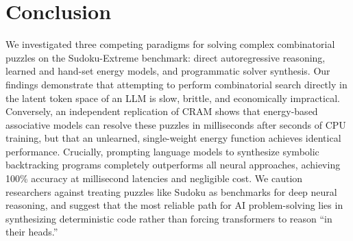 \documentclass{article} %
\begin{document}
\section{Conclusion}
\label{sec:conclusion}
We investigated three competing paradigms for solving complex combinatorial puzzles on the Sudoku-Extreme benchmark: direct autoregressive reasoning, learned and hand-set energy models, and programmatic solver synthesis. Our findings demonstrate that attempting to perform combinatorial search directly in the latent token space of an LLM is slow, brittle, and economically impractical. Conversely, an independent replication of CRAM shows that energy-based associative models can resolve these puzzles in milliseconds after seconds of CPU training, but that an unlearned, single-weight energy function achieves identical performance. Crucially, prompting language models to synthesize symbolic backtracking programs completely outperforms all neural approaches, achieving 100\% accuracy at millisecond latencies and negligible cost. We caution researchers against treating puzzles like Sudoku as benchmarks for deep neural reasoning, and suggest that the most reliable path for AI problem-solving lies in synthesizing deterministic code rather than forcing transformers to reason ``in their heads.''



\end{document}
